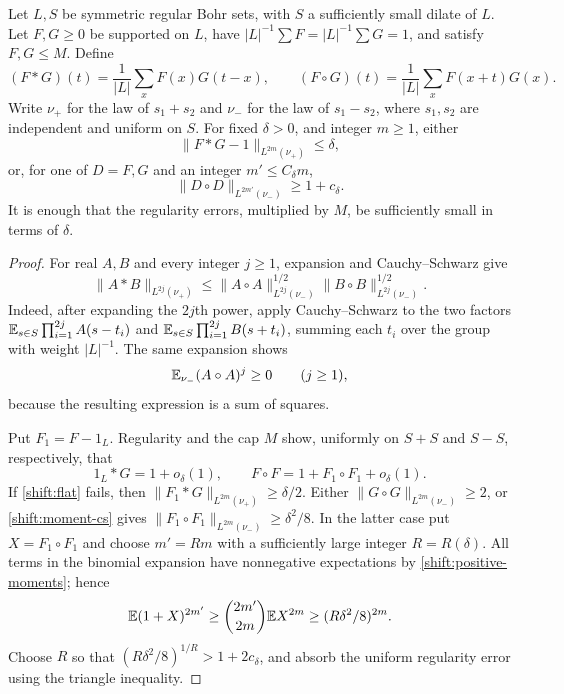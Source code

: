 \begin{lemma}\label{shift:local-moments}
Let $L,S$ be symmetric regular Bohr sets, with $S$ a sufficiently
small dilate of $L$.  Let $F,G\geq0$ be supported on $L$, have
$|L|^{-1}\sum F=|L|^{-1}\sum G=1$, and satisfy $F,G\leq M$.
Define
\[
 (F*G)(t)=\frac1{|L|}\sum_xF(x)G(t-x),\qquad
 (F\circ G)(t)=\frac1{|L|}\sum_xF(x+t)G(x).
\]
Write $\nu_+$ for the law of $s_1+s_2$ and $\nu_-$ for the law
of $s_1-s_2$, where $s_1,s_2$ are independent and uniform on $S$.
For fixed $\delta>0$, and integer $m\geq1$, either
\begin{equation}\label{shift:flat}
 \|F*G-1\|_{L^{2m}(\nu_+)}\leq\delta,
\end{equation}
or, for one of $D=F,G$ and an integer $m'\leq C_\delta m$,
\begin{equation}\label{shift:unbalanced}
 \|D\circ D\|_{L^{2m'}(\nu_-)}\geq1+c_\delta.
\end{equation}
It is enough that the regularity errors, multiplied by $M$, be
sufficiently small in terms of $\delta$.
\end{lemma}
\begin{proof}
For real $A,B$ and every integer $j\geq1$, expansion and
Cauchy--Schwarz give
\begin{equation}\label{shift:moment-cs}
 \|A*B\|_{L^{2j}(\nu_+)}
 \leq
 \|A\circ A\|_{L^{2j}(\nu_-)}^{1/2}
 \|B\circ B\|_{L^{2j}(\nu_-)}^{1/2}.
\end{equation}
Indeed, after expanding the $2j$th power, apply Cauchy--Schwarz
to the two factors
$\mathbb E_{s\in S}\prod_{i=1}^{2j}A(s-t_i)$ and
$\mathbb E_{s\in S}\prod_{i=1}^{2j}B(s+t_i)$, summing each $t_i$
over the group with weight $|L|^{-1}$.
The same expansion shows
\begin{equation}\label{shift:positive-moments}
 \mathbb E_{\nu_-}(A\circ A)^j\geq0\qquad(j\geq1),
\end{equation}
because the resulting expression is a sum of squares.

Put $F_1=F-1_L$.  Regularity and the cap $M$ show, uniformly on
$S+S$ and $S-S$, respectively, that
\[
 1_L*G=1+o_\delta(1),\qquad
 F\circ F=1+F_1\circ F_1+o_\delta(1).
\]
If \eqref{shift:flat} fails, then
$\|F_1*G\|_{L^{2m}(\nu_+)}\geq\delta/2$.
Either $\|G\circ G\|_{L^{2m}(\nu_-)}\geq2$, or
\eqref{shift:moment-cs} gives
$\|F_1\circ F_1\|_{L^{2m}(\nu_-)}\geq\delta^2/8$.
In the latter case put $X=F_1\circ F_1$ and choose
$m'=Rm$ with a sufficiently large integer $R=R(\delta)$.
All terms in the binomial expansion have nonnegative expectations
by \eqref{shift:positive-moments}; hence
\[
 \mathbb E(1+X)^{2m'}
 \geq \binom{2m'}{2m}\mathbb E X^{2m}
 \geq(R\delta^2/8)^{2m}.
\]
Choose $R$ so that $(R\delta^2/8)^{1/R}>1+2c_\delta$, and absorb
the uniform regularity error using the triangle inequality.
\end{proof}

